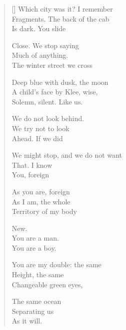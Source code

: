 \label{ch:northampton}
\settowidth{\versewidth}{We might stop, and we do not want}
\begin{verse}[\versewidth]
Which city was it? I remember\\
Fragments. The back of the cab\\
Is dark. You slide

Close. We stop saying\\
Much of anything.\\
The winter street we cross

Deep blue with dusk, the moon\\
A child's face by Klee, wise,\\
Solemn, silent. Like us.

We do not look behind.\\
We try not to look\\
Ahead. If we did

We might stop, and we do not want\\
That. I know\\
You, foreign

As you are, foreign\\
As I am, the whole\\
Territory of my body

New.\\
You are a man.\\
You are a boy.

You are my double: the same\\
Height, the same\\
Changeable green eyes,

The same ocean\\
Separating us\\
As it will.
\end{verse}
